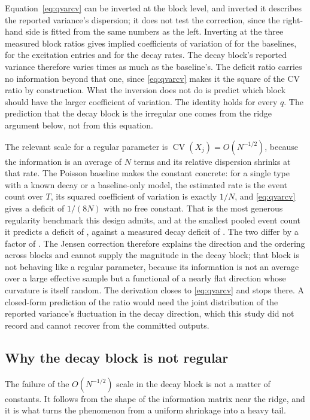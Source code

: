Equation~\eqref{eq:qvarcv} can be inverted at the block level, and inverted it
describes the reported variance's dispersion; it does not test the correction,
since the right-hand side is fitted from the same numbers as the left. Inverting at
the three measured block ratios gives implied coefficients of variation of
\ThCvMu{} for the baselines, \ThCvAlpha{} for the excitation entries and
\ThCvBeta{} for the decay rates. The decay block's reported variance therefore
varies \ThCvRatio{} times as much as the baseline's. The deficit ratio
\ThDefRatio{} carries no information beyond that one, since \eqref{eq:qvarcv} makes
it the square of the CV ratio by construction. What the inversion does not do is
predict which block should have the larger coefficient of variation. The identity
holds for every $q$. The prediction that the decay block is the irregular one comes
from the ridge argument below, not from this equation.

The relevant scale for a regular parameter is $\operatorname{CV}(X_j) = O(N^{-1/2})$,
because the information is an average of $N$ terms and its relative dispersion
shrinks at that rate. The Poisson baseline makes the constant concrete: for a
single type with a known decay or a baseline-only model, the estimated rate is the
event count over $T$, its squared coefficient of variation is exactly $1/N$, and
\eqref{eq:qvarcv} gives a deficit of $1/(8N)$ with no free constant. That is the
most generous regularity benchmark this design admits, and at the smallest pooled
event count it predicts a deficit of \ThRegDeficit{}, against a measured decay
deficit of \ThDefBeta{}. The two differ by a factor of \ThMismatch. The Jensen
correction therefore explains the direction and the ordering across blocks and
cannot supply the magnitude in the decay block; that block is not behaving
like a regular parameter, because its information is not an average over a large
effective sample but a functional of a nearly flat direction whose curvature is
itself random. The derivation closes to \eqref{eq:qvarcv} and stops there. A
closed-form prediction of the ratio would need the joint distribution of the
reported variance's fluctuation in the decay direction, which this study did not
record and cannot recover from the committed outputs.

\subsection{Why the decay block is not regular}

The failure of the $O(N^{-1/2})$ scale in the decay block is not a matter of
constants. It follows from the shape of the information matrix near the ridge, and
it is what turns the phenomenon from a uniform shrinkage into a heavy tail.

